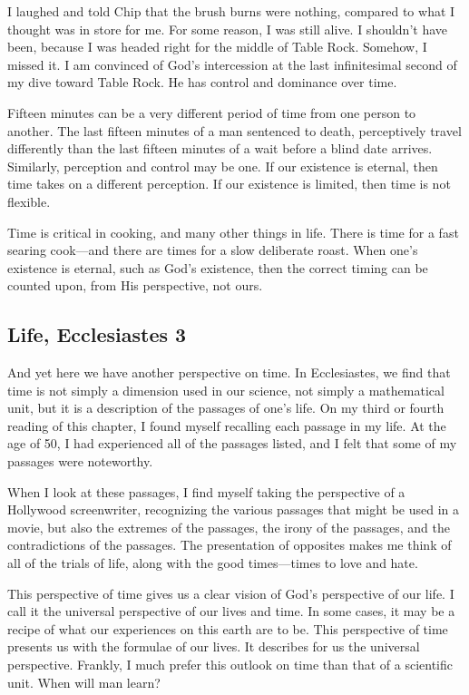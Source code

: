 \documentclass[12pt]{memoir}
\begin{document}
I laughed and told Chip that the brush burns were nothing, compared to what I thought was in store for me. For some reason, I was still
alive. I shouldn't have been, because I was headed right for the middle of
Table Rock. Somehow, I missed it. I am convinced of God's intercession
at the last infinitesimal second of my dive toward Table Rock. He
has control and dominance over time.

Fifteen minutes can be a very different period of time from one person
to another. The last fifteen minutes of a man sentenced to death,
perceptively travel differently than the last fifteen minutes of a
wait before a blind date arrives. Similarly, perception and control
may be one. If our existence is eternal, then time takes on a different
perception. If our existence is limited, then time is not flexible.

Time is critical in cooking, and many other things in life. There is time for a fast searing cook---and there are times for a slow deliberate roast. When one's existence is eternal, such as God's existence, then the correct timing can be counted upon, from His perspective,
not ours.

\subsection[Life]{Life, Ecclesiastes 3}

And yet here we have another perspective on time. In Ecclesiastes,
we find that time is not simply a dimension used in our science, not
simply a mathematical unit, but it is a description of the passages of one's life. On my third or fourth reading of this chapter, I found myself recalling each passage in my life. At the age of 50,
I had experienced all of the passages listed, and I felt that some
of my passages were noteworthy.

When I look at these passages, I find myself taking the perspective
of a Hollywood screenwriter, recognizing the various passages that
might be used in a movie, but also the extremes of the passages, the
irony of the passages, and the contradictions of the passages. The
presentation of opposites makes me think of all of the trials of life, along with the good times---times to love and hate.

This perspective of time gives us a clear vision of God's perspective
of our life. I call it the universal perspective of our lives and
time. In some cases, it may be a recipe of what our experiences on
this earth are to be. This perspective of time presents us with the
formulae of our lives. It describes for us the universal perspective.
Frankly, I much prefer this outlook on time than that of a scientific
unit. When will man learn?
\end{document}
